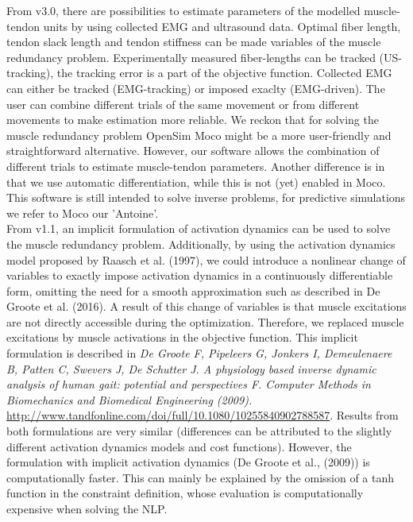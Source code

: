 \documentclass[a4paper,oneside,11pt]{article}
\begin{document}
From v3.0, there are possibilities to estimate parameters of the modelled muscle-tendon units by using collected EMG and ultrasound data. Optimal fiber length, tendon slack length and tendon stiffness can be made variables of the muscle redundancy problem. Experimentally measured fiber-lengths can be tracked (US-tracking), the tracking error is a part of the objective function. Collected EMG can either be tracked (EMG-tracking) or imposed exaclty (EMG-driven). The user can combine different trials of the same movement or from different movements to make estimation more reliable. We reckon that for solving the muscle redundancy problem OpenSim Moco might be a more user-friendly and straightforward alternative. However, our software allows the combination of different trials to estimate muscle-tendon parameters. Another difference is in that we use automatic differentiation, while this is not (yet) enabled in Moco. This software is still intended to solve inverse problems, for predictive simulations we refer to Moco our 'Antoine'. \\


From v1.1, an implicit formulation of activation dynamics can be used to solve the muscle redundancy problem. Additionally, by using the activation dynamics model proposed by Raasch et al. (1997), we could introduce a nonlinear change of variables to exactly impose activation dynamics in a continuously differentiable form, omitting the need for a smooth approximation such as described in De Groote et al. (2016). A result of this change of variables is that muscle excitations are not directly accessible during the optimization. Therefore, we replaced muscle excitations by muscle activations in the objective function. This implicit formulation is described in \textit{De Groote F, Pipeleers G, Jonkers I, Demeulenaere B, Patten C, Swevers J, De Schutter J. A physiology based inverse dynamic analysis of human gait: potential and perspectives F. Computer Methods in Biomechanics and Biomedical Engineering (2009).} \url{http://www.tandfonline.com/doi/full/10.1080/10255840902788587}. Results from both formulations are very similar (differences can be attributed to the slightly different activation dynamics models and cost functions). However, the formulation with implicit activation dynamics (De Groote et al., (2009)) is computationally faster. This can mainly be explained by the omission of a tanh function in the constraint definition, whose evaluation is computationally expensive when solving the NLP. \\
\end{document}
